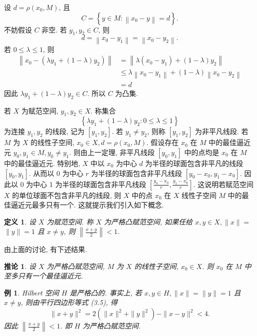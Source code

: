 \documentclass[openany]{ctexbook}
\makeatletter
\theoremstyle{kaiti}
\newtheorem{definition}{定义}[section]
\newtheorem{corollary}{推论}[section]
\theoremstyle{normal}
\newtheorem{example}{例}[section]
\renewenvironment{proof}[1][\proofname]{\par
    \pushQED{\qed}%
    \normalfont \topsep6\p@\@plus6\p@\relax
    \trivlist
    \item\relax
    {\heiti #1}\hspace{2\labelsep}\ignorespaces
  }{%
    \popQED\endtrivlist\@endpefalse
  }
\makeatother
\begin{document}
\begin{proof}
设 $d=\rho\left(x_0, M\right)$, 且
$$
C=\left\{y \in M:\left\|x_0-y\right\|=d\right\}.
$$
不妨假设 $C$ 非空. 若 $y_1, y_2 \in C$, 则
$$
d=\left\|x_0-y_1\right\|=\left\|x_0-y_2\right\|.
$$
若 $0 \leqslant \lambda \leqslant 1$, 则
$$
\begin{aligned}
\left\|x_0-\left(\lambda y_1+(1-\lambda) y_2\right)\right\| &=\left\|\lambda\left(x_0-y_1\right)+(1-\lambda) y_2\right\| \\
& \leqslant \lambda\left\|x_0-y_1\right\|+(1-\lambda)\left\|x_0-y_2\right\| \\
&=d
\end{aligned}
$$
因此 $\lambda y_1+(1-\lambda) y_2 \in C$. 所以 $C$ 为凸集.
\end{proof}

若 $X$ 为赋范空间, $y_1, y_2 \in X$. 称集合
$$
\left\{\lambda y_1+(1-\lambda) y_2: 0 \leqslant \lambda \leqslant 1\right\}
$$
为连接 $y_1, y_2$ 的线段, 记为 $\left[y_1, y_2\right]$. 若 $y_1 \neq y_2$, 则称 $\left[y_1, y_2\right]$ 为非平凡线段. 若 $M$ 为 $X$ 的线性子空间, $x_0 \in X, d=\rho\left(x_0, M\right)$. 假设存在 $x_0$ 在 $M$ 中的最佳逼近元 $y_0, y_1 \in M, y_0 \neq y_1$. 则由上一定理, 非平凡线段 $\left[y_0, y_1\right]$ 中的点均是 $x_0$ 在 $M$ 中的最佳逼近元. 特别地, $X$ 中以 $x_0$ 为中心 $d$ 为半径的球面包含非平凡的线段 $\left[y_0, y_1\right]$. 从而以 0 为中心 $r$ 为半径的球面包含非平凡线段 $\left[y_0-x_0, y_1-x_0\right]$. 因此以 0 为中心 1 为半径的球面包含非平凡线段 $\left[\frac{y_0-x_0}{r}, \frac{y_1-x_0}{r}\right]$. 这说明若赋范空间 $X$ 的单位球面不包含非平凡的线段, 则 $X$ 中的点 $x_0$ 在 $X$ 线性子空间 $M$ 中的最佳逼近元最多只有一个. 这就提示我们引入如下概念.

\begin{definition}
设 $X$ 为赋范空间. 称 $X$ 为严格凸赋范空间, 如果任给 $x, y \in X,\|x\|=$ $\|y\|=1$ 且 $x \neq y$, 则 $\left\|\frac{x+y}{2}\right\|<1$.
\end{definition}

由上面的讨论, 有下述结果.

\begin{corollary}
设 $X$ 为严格凸赋范空间, $M$ 为 $X$ 的线性子空间, $x_0 \in X$. 则 $x_0$ 在 $M$ 中至多只有一个最佳逼近元.
\end{corollary}

\begin{example}
Hilbert 空间 $H$ 是严格凸的. 事实上, 若 $x, y \in H,\|x\|=\|y\|=1$ 且 $x \neq y$, 则由平行四边形等式 (3.5), 得
$$
\|x+y\|^2=2\left(\|x\|^2+\|y\|^2\right)-\|x-y\|^2<4.
$$
因此 $\left\|\frac{x+y}{2}\right\|<1$. 即 $H$ 为严格凸赋范空间.
\end{example}
\end{document}
